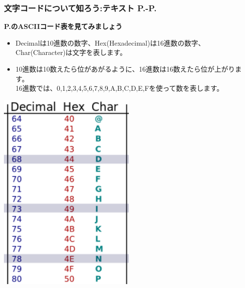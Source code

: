 \documentclass[dvipdfmx]{beamer}
\begin{document}
\begin{frame}[fragile]
	\frametitle{文字コードについて知ろう:テキスト P.\pageref{1:P:charCode}-P.\pageref{1:P:scraping}~~~}
    \large\textbf{P.\pageref{1:P:charCode}のASCIIコード表を見てみましょう}\\
    \begin{minipage}{0.55\textwidth}
        \begin{itemize}
            \item Decimalは10進数の数字、Hex(Hexadecimal)は16進数の数字、Char(Character)は文字を表します。
            \item 10進数は10数えたら位があがるように、16進数は16数えたら位が上がります。\\16進数では、0,1,2,3,4,5,6,7,8,9,A,B,C,D,E,Fを使って数を表します。
        \end{itemize}
    \end{minipage}
    \hfill
    \begin{minipage}{0.4\textwidth}
        {\upshape
            \includegraphics[height=0.7\textheight]{slide08-img005.png}}
    \end{minipage}
\end{frame}
\end{document}
